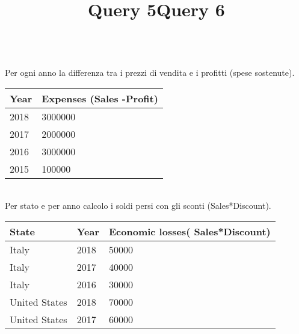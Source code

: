 \documentclass[11pt,a4paper]{article}
\begin{document}
\title{\textbf{Query 5}}\\
Per ogni anno la differenza tra i prezzi di vendita e i profitti (spese sostenute).
\begin{table}[h!]
	\begin{tabular}{|l|l|}
		\hline
		Year & Expenses (Sales -Profit) \\ \hline
		2018 & 3000000\EUR                  \\ \hline
		2017 & 2000000\EUR                  \\ \hline
		2016 & 3000000\EUR                  \\ \hline
		2015 & 100000\EUR                   \\ \hline
	\end{tabular}
\end{table}

\title{\textbf{Query 6}}\\
Per stato e per anno calcolo i soldi persi con gli sconti (Sales*Discount).
\begin{table}[h!]
	\begin{tabular}{|l|l|l|}
		\hline
		State         & Year & Economic losses( Sales*Discount) \\ \hline
		Italy         & 2018 & 50000\EUR                            \\ \hline
		Italy         & 2017 & 40000\EUR                            \\ \hline
		Italy         & 2016 & 30000\EUR                            \\ \hline
		United States & 2018 & 70000\EUR                            \\ \hline
		United States & 2017 & 60000\EUR                            \\ \hline
	\end{tabular}
\end{table}
\end{document}
